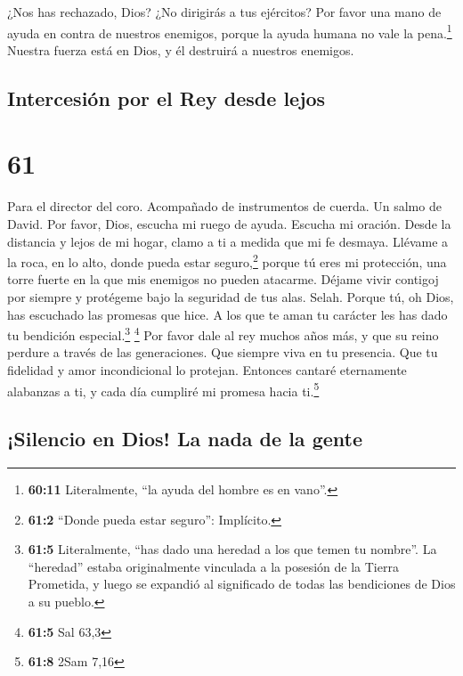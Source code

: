  ¿Nos has rechazado, Dios? ¿No dirigirás a tus ejércitos?
 Por favor una mano de ayuda en contra de nuestros
enemigos, porque la ayuda humana no vale la pena.\footnote{\textbf{60:11}
  Literalmente, ``la ayuda del hombre es en vano''.} 
Nuestra fuerza está en Dios, y él destruirá a nuestros enemigos.

\hypertarget{intercesiuxf3n-por-el-rey-desde-lejos}{%
\subsection{Intercesión por el Rey desde
lejos}\label{intercesiuxf3n-por-el-rey-desde-lejos}}

\hypertarget{section-60}{%
\section{61}\label{section-60}}

Para el director del coro. Acompañado de instrumentos de cuerda. Un
salmo de David.  Por favor, Dios, escucha mi ruego de
ayuda. Escucha mi oración.  Desde la distancia y lejos de
mi hogar, clamo a ti a medida que mi fe desmaya. Llévame a la roca, en
lo alto, donde pueda estar seguro,\footnote{\textbf{61:2} ``Donde pueda
  estar seguro'': Implícito.}  porque tú eres mi
protección, una torre fuerte en la que mis enemigos no pueden atacarme.
 Déjame vivir contigoj por siempre y protégeme bajo la
seguridad de tus alas. Selah.  Porque tú, oh Dios, has
escuchado las promesas que hice. A los que te aman tu carácter les has
dado tu bendición especial.\footnote{\textbf{61:5} Literalmente, ``has
  dado una heredad a los que temen tu nombre''. La ``heredad'' estaba
  originalmente vinculada a la posesión de la Tierra Prometida, y luego
  se expandió al significado de todas las bendiciones de Dios a su
  pueblo.} \footnote{\textbf{61:5} Sal 63,3}  Por favor
dale al rey muchos años más, y que su reino perdure a través de las
generaciones.  Que siempre viva en tu presencia. Que tu
fidelidad y amor incondicional lo protejan.  Entonces
cantaré eternamente alabanzas a ti, y cada día cumpliré mi promesa hacia
ti.\footnote{\textbf{61:8} 2Sam 7,16}

\hypertarget{silencio-en-dios-la-nada-de-la-gente}{%
\subsection{¡Silencio en Dios! La nada de la
gente}\label{silencio-en-dios-la-nada-de-la-gente}}

